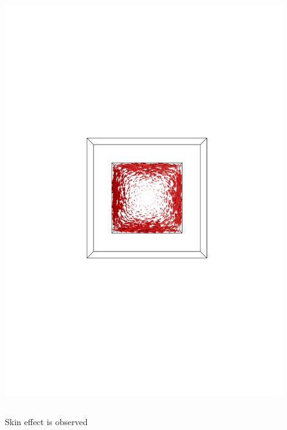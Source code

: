 \documentclass[compress]{beamer}
\begin{document}
\begin{frame}
\begin{columns}[totalwidth=\textwidth]
\begin{column}{.35\textwidth}
	\includegraphics[width=0.9\textwidth]{Graphic/04_B3cubeeddy3MHz_XYview.pdf}
	\end{column}
\end{columns}
{\color{green} Skin effect is observed}
\end{frame}
\end{document}
